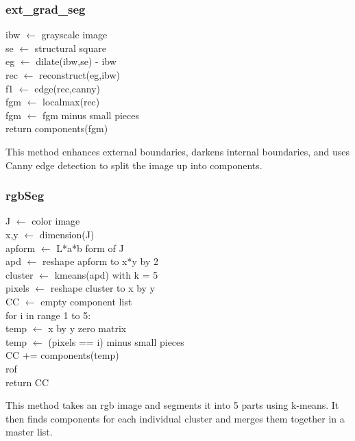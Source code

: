 \documentclass[12pt]{article}
\newcommand\tab[1][1cm]{\hspace*{#1}}
\begin{document}
\subsubsection*{ext\_grad\_seg}
\begin{addmargin}[12em]{1em}
	ibw $\leftarrow$ grayscale image \\
	se $\leftarrow$ structural square \\
	eg $\leftarrow$ dilate(ibw,se) - ibw \\
	rec $\leftarrow$ reconstruct(eg,ibw) \\
	f1 $\leftarrow$ edge(rec,canny) \\
	fgm $\leftarrow$ localmax(rec) \\
	fgm $\leftarrow$ fgm minus small pieces \\
	return components(fgm) \\
\end{addmargin}
This method enhances external boundaries, darkens internal boundaries, and uses Canny edge detection to split the image up into components.

\subsubsection*{rgbSeg}
\begin{addmargin}[12em]{1em}
	J $\leftarrow$ color image \\
	x,y $\leftarrow$ dimension(J) \\
	apform $\leftarrow$ L*a*b form of J \\
	apd $\leftarrow$ reshape apform to x*y by 2 \\
	cluster $\leftarrow$ kmeans(apd) with k = 5 \\
	pixels $\leftarrow$ reshape cluster to x by y \\
	CC $\leftarrow$ empty component list \\
	for i in range 1 to 5: \\
	\tab temp $\leftarrow$ x by y zero matrix \\
	\tab temp $\leftarrow$ (pixels == i) minus small pieces \\
	\tab CC += components(temp) \\
	rof \\
	return CC \\
\end{addmargin}
This method takes an rgb image and segments it into 5 parts using k-means. It then finds components for each individual cluster and merges them together in a master list. 
\end{document}
